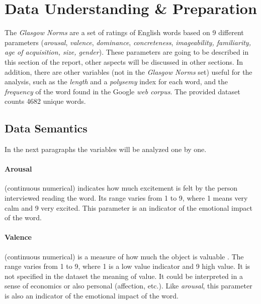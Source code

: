 \documentclass[a4paper,11pt,dvipsnames]{article}
\begin{document}
		\makeatother
		\restoregeometry
	\onecolumn \tableofcontents
		\newpage
\section{Data Understanding \& Preparation}
The \textit{Glasgow Norms} are a set of ratings of English words based on 9 different parameters (\textit{arousal}, \textit{valence}, \textit{dominance}, \textit{concreteness}, \textit{imageability, familiarity, age of acquisition, size, gender}). These parameters are going to be described in this section of the report, other aspects will be discussed in other sections. In addition, there are other variables (not in the \textit{Glasgow Norms} set) useful for the analysis, such as the \textit{length} and a \textit{polysemy} index for each word, and the \textit{frequency} of the word found in the Google \textit{web corpus}. The provided dataset counts 4682 unique words. 


\subsection{Data Semantics}\label{semantic}
In the next paragraphs the variables will be analyzed one by one. 




\paragraph{Arousal} (continuous numerical) indicates how much excitement is felt by the person interviewed reading the word. Its range varies from 1 to 9, where 1 means very calm and 9 very excited. This parameter is an indicator of the emotional impact of the word.
%
\paragraph{Valence} (continuous numerical) is a measure of how much the object is valuable . The range varies from 1 to 9, where 1 is a low value indicator and 9 high value. It is not specified in the dataset the meaning of value. It could be interpreted in a sense of economics or also personal (affection, etc.). Like \textit{arousal}, this parameter is also an indicator of the emotional impact of the word.
%
\end{document}
